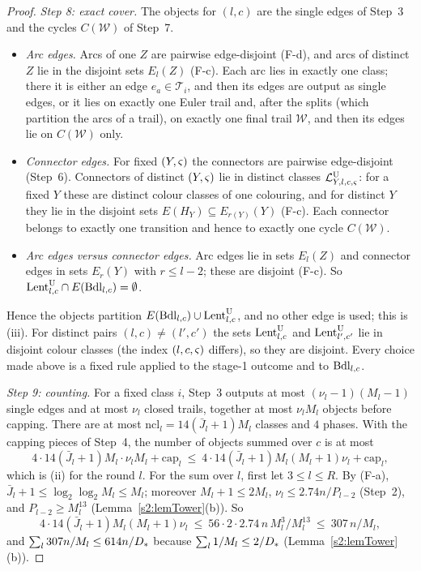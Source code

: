 \begin{proof}
\emph{Step 8: exact cover.} The objects for $(l,c)$ are the single edges of Step~3 and the cycles $C(\mathcal W)$ of Step~7.
\begin{itemize}
\item \emph{Arc edges.} Arcs of one $Z$ are pairwise edge-disjoint (F-d), and arcs of distinct $Z$ lie in the disjoint sets $E_l(Z)$ (F-c). Each arc lies in exactly one class; there it is either an edge $e_a\in\mathcal T_i$, and then its edges are output as single edges, or it lies on exactly one Euler trail and, after the splits (which partition the arcs of a trail), on exactly one final trail $\mathcal W$, and then its edges lie on $C(\mathcal W)$ only.
\item \emph{Connector edges.} For fixed $(Y,\varsigma)$ the connectors are pairwise edge-disjoint (Step~6). Connectors of distinct $(Y,\varsigma)$ lie in distinct classes $\mathcal{L}^{\mathrm{U}}_{Y,l,c,\varsigma}$: for a fixed $Y$ these are distinct colour classes of one colouring, and for distinct $Y$ they lie in the disjoint sets $E(H_Y)\subseteq E_{r(Y)}(Y)$ (F-c). Each connector belongs to exactly one transition and hence to exactly one cycle $C(\mathcal W)$.
\item \emph{Arc edges versus connector edges.} Arc edges lie in sets $E_l(Z)$ and connector edges in sets $E_r(Y)$ with $r\le l-2$; these are disjoint (F-c). So $\mathrm{Lent}^{\mathrm{U}}_{l,c}\cap E(\mathrm{Bdl}_{l,c})=\emptyset$.
\end{itemize}
Hence the objects partition $E(\mathrm{Bdl}_{l,c})\cup\mathrm{Lent}^{\mathrm{U}}_{l,c}$, and no other edge is used; this is (iii). For distinct pairs $(l,c)\ne(l',c')$ the sets $\mathrm{Lent}^{\mathrm{U}}_{l,c}$ and $\mathrm{Lent}^{\mathrm{U}}_{l',c'}$ lie in disjoint colour classes (the index $(l,c,\varsigma)$ differs), so they are disjoint. Every choice made above is a fixed rule applied to the stage-1 outcome and to $\mathrm{Bdl}_{l,c}$.

\emph{Step 9: counting.} For a fixed class $i$, Step~3 outputs at most $(\nu_l-1)(M_l-1)$ single edges and at most $\nu_l$ closed trails, together at most $\nu_lM_l$ objects before capping. There are at most $\mathrm{ncl}_l=14(\bar J_l+1)M_l$ classes and $4$ phases. With the capping pieces of Step~4, the number of objects summed over $c$ is at most
\[
4\cdot14(\bar J_l+1)M_l\cdot\nu_lM_l+\mathrm{cap}_l\ \le\ 4\cdot14(\bar J_l+1)M_l(M_l+1)\nu_l+\mathrm{cap}_l ,
\]
which is (ii) for the round $l$. For the sum over $l$, first let $3\le l\le R$. By (F-a), $\bar J_l+1\le\log_2\log_2M_l\le M_l$; moreover $M_l+1\le2M_l$, $\nu_l\le2.74n/P_{l-2}$ (Step~2), and $P_{l-2}\ge M_l^{13}$ (Lemma~\ref{s2:lemTower}(b)). So
\[
4\cdot14(\bar J_l+1)M_l(M_l+1)\nu_l\ \le\ 56\cdot2\cdot2.74\,n\,M_l^{3}/M_l^{13}\ \le\ 307\,n/M_l ,
\]
and $\sum_l307n/M_l\le614n/D_{*}$ because $\sum_l1/M_l\le2/D_{*}$ (Lemma~\ref{s2:lemTower}(b)).


\end{proof}

